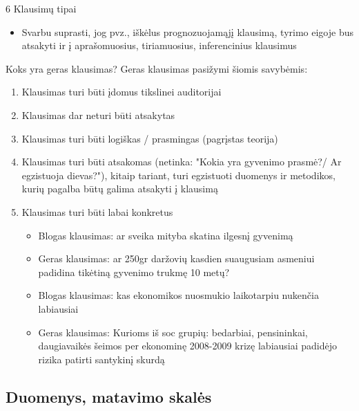\documentclass[11pt,xcolor=table]{beamer}
\begin{document}

\begin{frame}{6 Klausimų tipai}
\begin{itemize}
\item Svarbu suprasti, jog pvz., iškėlus prognozuojamąjį klausimą, tyrimo eigoje   bus atsakyti ir į aprašomuosius, tiriamuosius, inferencinius klausimus 
\end{itemize}
\end{frame}

\begin{frame}{Koks yra geras klausimas?}
Geras klausimas pasižymi šiomis savybėmis:
\begin{enumerate}
\item Klausimas turi būti įdomus tikslinei auditorijai
\item Klausimas dar neturi būti atsakytas
\item Klausimas turi būti logiškas / prasmingas (pagrįstas teorija)
\item Klausimas turi būti atsakomas (netinka: "Kokia yra gyvenimo prasmė?/ Ar egzistuoja dievas?"), kitaip tariant, turi egzistuoti duomenys ir metodikos, kurių pagalba būtų galima atsakyti į klausimą
\item Klausimas turi būti labai konkretus
\begin{itemize}
\item Blogas klausimas: ar sveika mityba skatina ilgesnį gyvenimą
\item Geras klausimas: ar 250gr daržovių kasdien suaugusiam asmeniui padidina tikėtiną gyvenimo trukmę 10 metų?
\item Blogas klausimas: kas ekonomikos nuosmukio laikotarpiu nukenčia labiausiai
\item Geras klausimas: Kurioms iš soc grupių: bedarbiai, pensininkai, daugiavaikės šeimos per ekonominę 2008-2009 krizę labiausiai padidėjo rizika patirti santykinį skurdą 
\end{itemize}
\end{enumerate}
\end{frame}




\subsection{Duomenys, matavimo skalės}
\end{document}
